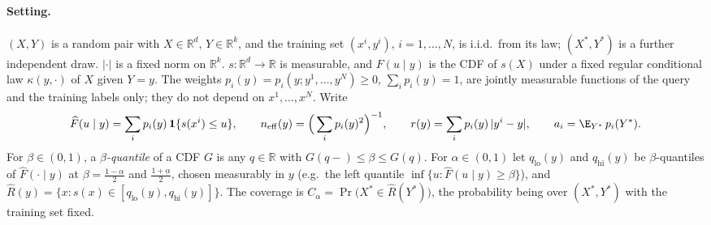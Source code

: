 %

\paragraph{Setting.}
$(X,Y)$ is a random pair with $X\in\mathbb R^d$, $Y\in\mathbb R^k$, and the training set
$(x^i,y^i)$, $i=1,\dots,N$, is i.i.d.\ from its law; $(X^*,Y^*)$ is a further independent
draw. $|\cdot|$ is a fixed norm on $\mathbb R^k$. $s:\mathbb R^d\to\mathbb R$ is measurable, and
$F(u\mid y)$ is the CDF of $s(X)$ under a fixed regular conditional law $\kappa(y,\cdot)$ of $X$
given $Y=y$. The weights $p_i(y)=p_i(y;y^1,\dots,y^N)\ge0$, $\sum_ip_i(y)=1$, are jointly
measurable functions of the query and the training labels only; they do not depend on
$x^1,\dots,x^N$. Write
\[
\widehat F(u\mid y)=\sum_ip_i(y)\,\mathbf 1\{s(x^i)\le u\},\qquad
n_{\mathrm{eff}}(y)=\Big(\sum_ip_i(y)^2\Big)^{-1},\qquad
r(y)=\sum_ip_i(y)\,|y^i-y|,\qquad a_i=\E_{Y^*}\,p_i(Y^*).
\]
For $\beta\in(0,1)$, a \emph{$\beta$-quantile} of a CDF $G$ is any $q\in\mathbb R$ with
$G(q-)\le\beta\le G(q)$. For $\alpha\in(0,1)$ let $q_{\mathrm{lo}}(y)$ and $q_{\mathrm{hi}}(y)$
be $\beta$-quantiles of $\widehat F(\cdot\mid y)$ at $\beta=\frac{1-\alpha}2$ and
$\frac{1+\alpha}2$, chosen measurably in $y$ (e.g.\ the left quantile
$\inf\{u:\widehat F(u\mid y)\ge\beta\}$), and
$\widehat R(y)=\{x:s(x)\in[q_{\mathrm{lo}}(y),q_{\mathrm{hi}}(y)]\}$. The coverage is
$C_\alpha=\Pr\big(X^*\in\widehat R(Y^*)\big)$, the probability being over $(X^*,Y^*)$ with
the training set fixed.

